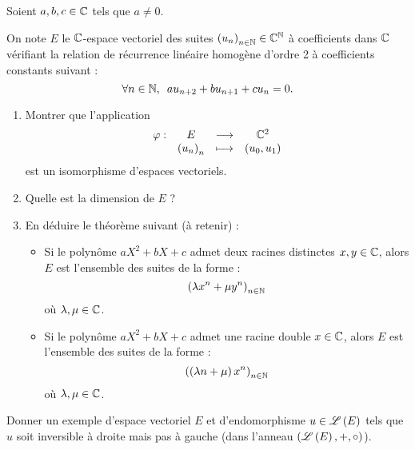 \begin{exo}
Soient \(a,b,c\in\mathbb{C}\) tels que \(a\not=0\).

On note \(E\) le \(\mathbb{C}\)-espace vectoriel des suites \(\left(u_n\right)_{n\in\mathbb{N}}\in\mathbb{C}^{\mathbb{N}}\) à coefficients dans \(\mathbb{C}\) vérifiant la relation de récurrence linéaire homogène d'ordre 2 à coefficients constants suivant : \[\quantifs{\forall n\in\N}au_{n+2}+bu_{n+1}+cu_n=0.\]

\begin{enumerate}
\item Montrer que l'application \[\begin{array}[t]{cccc}\varphi : & E & \longrightarrow & \mathbb{C}^2 \\ & \left(u_n\right)_n & \longmapsto & \left(u_0,u_1\right)\end{array}\] est un isomorphisme d'espaces vectoriels. \\

\item Quelle est la dimension de \(E\) ? \\

\item En déduire le théorème suivant (à retenir) :

\begin{itemize}
\item Si le polynôme \(aX^2+bX+c\) admet deux racines distinctes \(x,y\in\mathbb{C}\), alors \(E\) est l'ensemble des suites de la forme : \[\left(\lambda x^n+\mu y^n\right)_{n\in\mathbb{N}}\] où \(\lambda,\mu\in\mathbb{C}\). \\

\item Si le polynôme \(aX^2+bX+c\) admet une racine double \(x\in\mathbb{C}\), alors \(E\) est l'ensemble des suites de la forme : \[\left(\left(\lambda n+\mu\right)x^n\right)_{n\in\mathbb{N}}\] où \(\lambda,\mu\in\mathbb{C}\).
\end{itemize}
\end{enumerate}
\end{exo}

\begin{corr}
\end{corr}

\begin{exo}[Exercice 4]
Donner un exemple d'espace vectoriel \(E\) et d'endomorphisme \(u\in\mathscr{L}\left(E\right)\) tels que \(u\) soit inversible à droite mais pas à gauche (dans l'anneau \(\anneau{\Lendo{E}}[+][\rond]\)).
\end{exo}

\begin{corr}
\end{corr}

